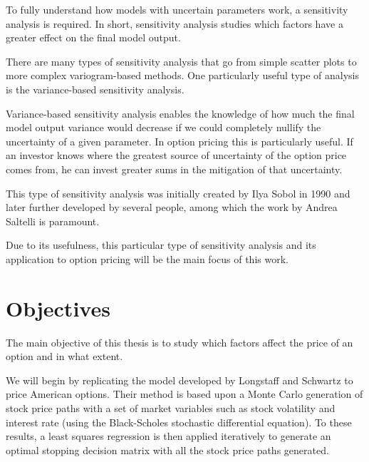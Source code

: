 \documentclass[a4paper,prd,twocolumn,nofootinbib,superscriptaddress,floatfix]{revtex4}
\begin{document}
To fully understand how models with uncertain parameters work, a sensitivity analysis is required. In short, sensitivity analysis studies which factors have a greater effect on the final model output.

There are many types of sensitivity analysis that go from simple scatter plots to more complex variogram-based methods. One particularly useful type of analysis is the variance-based sensitivity analysis.

Variance-based sensitivity analysis enables the knowledge of how much the final model output variance would decrease if we could completely nullify the uncertainty of a given parameter.
In option pricing this is particularly useful. If an investor knows where the greatest source of uncertainty of the option price comes from, he can invest greater sums in the mitigation of that uncertainty.

This type of sensitivity analysis was initially created by Ilya Sobol in 1990 and later further developed by several people, among which the work by Andrea Saltelli is paramount.

Due to its usefulness, this particular type of sensitivity analysis and its application to option pricing will be the main focus of this work.

\section{Objectives}
The main objective of this thesis is to study which factors affect the price of an option and in what extent.

We will begin by replicating the model developed by Longstaff and Schwartz to price American options. Their method is based upon a Monte Carlo generation of stock price paths with a set of market variables such as stock volatility and interest rate (using the Black-Scholes stochastic differential equation). To these results, a least squares regression is then applied iteratively to generate an optimal stopping decision matrix with all the stock price paths generated.
\end{document}
